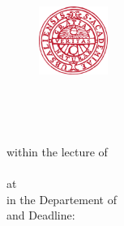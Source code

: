 
\begin{titlepage}


\begin{figure}
	\raggedright
	\includegraphics[width=0.2\textwidth]{./fig/uppsla_university.png}
\end{figure}


\begin{center}
	\vspace*{0pt}
	\noindent\makebox[\linewidth]{\rule{\textwidth}{0.4pt}}
	\begin{Huge}
		\textbf{\mytitle}\\
	\end{Huge}
	\vspace*{4em}
	\begin{LARGE}
		\textbf{\MakeUppercase{\mytypeofwork}}\\
	\end{LARGE}	
	\noindent\makebox[\linewidth]{\rule{\paperwidth}{0.4pt}}
	\vspace*{2em}
	within the lecture of\\
	\mycourse\\
	\vspace*{2em}
	at \myuniversity\\
	in the Departement of \mydepartement\\
	\vspace*{2em}
	\myauthora{} and \myauthorb{}
	\vspace*{2em}
	Deadline: \myduedate\\
	\vspace*{3em}
	\vfill
	

\end{center}
\end{titlepage}
